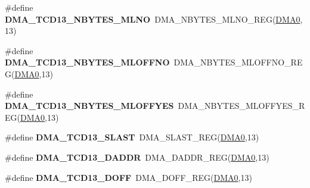 \begin{DoxyCompactItemize}
\item 
\#define {\bfseries D\+M\+A\+\_\+\+T\+C\+D13\+\_\+\+N\+B\+Y\+T\+E\+S\+\_\+\+M\+L\+NO}~D\+M\+A\+\_\+\+N\+B\+Y\+T\+E\+S\+\_\+\+M\+L\+N\+O\+\_\+\+R\+EG(\hyperlink{group__DMA__Peripheral__Access__Layer_ga4103044f9ca209772f513dc694513ffb}{D\+M\+A0},13)\hypertarget{group__DMA__Register__Accessor__Macros_gaab87071d26a96462642ee41f335a33b6}{}\label{group__DMA__Register__Accessor__Macros_gaab87071d26a96462642ee41f335a33b6}

\item 
\#define {\bfseries D\+M\+A\+\_\+\+T\+C\+D13\+\_\+\+N\+B\+Y\+T\+E\+S\+\_\+\+M\+L\+O\+F\+F\+NO}~D\+M\+A\+\_\+\+N\+B\+Y\+T\+E\+S\+\_\+\+M\+L\+O\+F\+F\+N\+O\+\_\+\+R\+EG(\hyperlink{group__DMA__Peripheral__Access__Layer_ga4103044f9ca209772f513dc694513ffb}{D\+M\+A0},13)\hypertarget{group__DMA__Register__Accessor__Macros_ga993e012974c139fa90448d13ffab5eb7}{}\label{group__DMA__Register__Accessor__Macros_ga993e012974c139fa90448d13ffab5eb7}

\item 
\#define {\bfseries D\+M\+A\+\_\+\+T\+C\+D13\+\_\+\+N\+B\+Y\+T\+E\+S\+\_\+\+M\+L\+O\+F\+F\+Y\+ES}~D\+M\+A\+\_\+\+N\+B\+Y\+T\+E\+S\+\_\+\+M\+L\+O\+F\+F\+Y\+E\+S\+\_\+\+R\+EG(\hyperlink{group__DMA__Peripheral__Access__Layer_ga4103044f9ca209772f513dc694513ffb}{D\+M\+A0},13)\hypertarget{group__DMA__Register__Accessor__Macros_ga1389c6de1ab258aa1fde43bc72b591f0}{}\label{group__DMA__Register__Accessor__Macros_ga1389c6de1ab258aa1fde43bc72b591f0}

\item 
\#define {\bfseries D\+M\+A\+\_\+\+T\+C\+D13\+\_\+\+S\+L\+A\+ST}~D\+M\+A\+\_\+\+S\+L\+A\+S\+T\+\_\+\+R\+EG(\hyperlink{group__DMA__Peripheral__Access__Layer_ga4103044f9ca209772f513dc694513ffb}{D\+M\+A0},13)\hypertarget{group__DMA__Register__Accessor__Macros_ga441804340780ca409f6bfe9fbf95d79f}{}\label{group__DMA__Register__Accessor__Macros_ga441804340780ca409f6bfe9fbf95d79f}

\item 
\#define {\bfseries D\+M\+A\+\_\+\+T\+C\+D13\+\_\+\+D\+A\+D\+DR}~D\+M\+A\+\_\+\+D\+A\+D\+D\+R\+\_\+\+R\+EG(\hyperlink{group__DMA__Peripheral__Access__Layer_ga4103044f9ca209772f513dc694513ffb}{D\+M\+A0},13)\hypertarget{group__DMA__Register__Accessor__Macros_ga1245031f8c78e442dc8fc199e90fd4ef}{}\label{group__DMA__Register__Accessor__Macros_ga1245031f8c78e442dc8fc199e90fd4ef}

\item 
\#define {\bfseries D\+M\+A\+\_\+\+T\+C\+D13\+\_\+\+D\+O\+FF}~D\+M\+A\+\_\+\+D\+O\+F\+F\+\_\+\+R\+EG(\hyperlink{group__DMA__Peripheral__Access__Layer_ga4103044f9ca209772f513dc694513ffb}{D\+M\+A0},13)\hypertarget{group__DMA__Register__Accessor__Macros_ga08cd40b8ffba8b31eed59271d92c8411}{}\label{group__DMA__Register__Accessor__Macros_ga08cd40b8ffba8b31eed59271d92c8411}


\end{DoxyCompactItemize}
